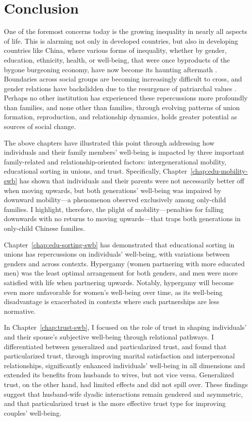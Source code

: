 \chapter{Conclusion}
\label{chap:conclusion}

One of the foremost concerns today is the growing inequality in nearly all aspects of life. This is alarming not only in developed countries, but also in developing countries like China, where various forms of inequality, whether by gender, education, ethnicity, health, or well-being, that were once byproducts of the bygone burgeoning economy, have now become its haunting aftermath \parencite{sicularUrbanRuralIncomeGap2007,xieIncomeInequalityTodays2014,yeungHigherEducationExpansion2013}. Boundaries across social groups are becoming increasingly difficult to cross, and gender relations have backslidden due to the resurgence of patriarchal values \parencite{jiUnequalCareUnequal2017}. Perhaps no other institution has experienced these repercussions more profoundly than families, and none other than families, through evolving patterns of union formation, reproduction, and relationship dynamics, holds greater potential as sources of social change.

The above chapters have illustrated this point through addressing how individuals and their family members' well-being is impacted by three important family-related and relationship-oriented factors: intergenerational mobility, educational sorting in unions, and trust. Specifically, Chapter~\ref{chap:edu-mobility-swb} has shown that individuals and their parents were not necessarily better off when moving upwards, but both generations' well-being was impaired by downward mobility—a phenomenon observed exclusively among only-child families. I highlight, therefore, the plight of mobility—penalties for falling downwards with no returns to moving upwards—that traps both generations in only-child Chinese families.

Chapter~\ref{chap:edu-sorting-swb} has demonstrated that educational sorting in unions has repercussions on individuals' well-being, with variations between genders and across contexts. Hypergamy (women partnering with more educated men) was the least optimal arrangement for both genders, and men were more satisfied with life when partnering upwards. Notably, hypergamy will become even more unfavorable for women's well-being over time, as its well-being disadvantage is exacerbated in contexts where such partnerships are less normative.

In Chapter~\ref{chap:trust-swb}, I focused on the role of trust in shaping individuals' and their spouse's subjective well-being through relational pathways. I differentiated between generalized and particularized trust, and found that particularized trust, through improving marital satisfaction and interpersonal relationships, significantly enhanced individuals' well-being in all dimensions and extended its benefits from husbands to wives, but not vice versa. Generalized trust, on the other hand, had limited effects and did not spill over. These findings suggest that husband-wife dyadic interactions remain gendered and asymmetric, and that particularized trust is the more effective trust type for improving couples' well-being.


